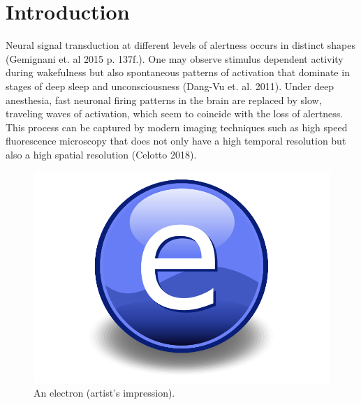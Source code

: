 
\chapter{Introduction} %

\label{introduction}


\newcommand{\keyword}[1]{\textbf{#1}}
\newcommand{\tabhead}[1]{\textbf{#1}}
\newcommand{\code}[1]{\texttt{#1}}
\newcommand{\file}[1]{\texttt{\bfseries#1}}
\newcommand{\option}[1]{\texttt{\itshape#1}}


Neural signal transduction at different levels of alertness occurs in distinct shapes (Gemignani et. al 2015 p. 137f.). One may observe stimulus dependent activity during wakefulness but also spontaneous patterns of activation that dominate in stages of deep sleep and unconsciousness (Dang-Vu et. al. 2011). Under deep anesthesia, fast neuronal firing patterns in the brain are replaced by slow, traveling waves of activation, which seem to coincide with the loss of alertness. This process can be captured by modern imaging techniques such as high speed fluorescence microscopy that does not only have a high temporal resolution but also a high spatial resolution (Celotto 2018).

\begin{figure}[th]
\centering
\includegraphics{Figures/Electron}
\decoRule
\caption[An Electron]{An electron (artist's impression).}
\label{fig:Electron}
\end{figure}

